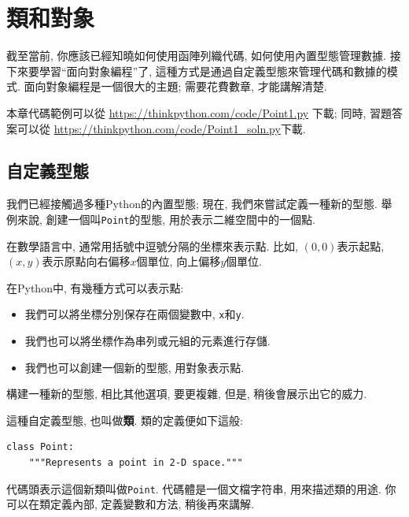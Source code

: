 \documentclass[10pt]{book}
\begin{document}
\chapter{類和對象}
\label{clobjects}

截至當前, 你應該已經知曉如何使用函陣列織代碼, 
如何使用內置型態管理數據. 
接下來要學習``面向對象編程''了, 
這種方式是通過自定義型態來管理代碼和數據的模式. 
面向對象編程是一個很大的主題; 需要花費數章, 才能講解清楚. 

本章代碼範例可以從
\url{https://thinkpython.com/code/Point1.py} 下載;
同時, 習題答案可以從
\url{https://thinkpython.com/code/Point1_soln.py}下載.


\section{自定義型態}
\label{point}

我們已經接觸過多種Python的內置型態;
現在, 我們來嘗試定義一種新的型態. 
舉例來說, 創建一個叫{\tt Point}的型態, 用於表示二維空間中的一個點. 

在數學語言中, 通常用括號中逗號分隔的坐標來表示點. 
比如, $(0,0)$表示起點, $(x,y)$表示原點向右偏移$x$個單位, 
向上偏移$y$個單位. 

在Python中, 有幾種方式可以表示點:

\begin{itemize}

\item 我們可以將坐標分別保存在兩個變數中, {\tt x}和{\tt y}. 

\item 我們也可以將坐標作為串列或元組的元素進行存儲. 

\item 我們也可以創建一個新的型態, 用對象表示點. 

\end{itemize}

構建一種新的型態, 相比其他選項, 要更複雜, 
但是, 稍後會展示出它的威力. 

這種自定義型態, 也叫做{\bf 類}. 
類的定義便如下這般:

\begin{verbatim}
class Point:
    """Represents a point in 2-D space."""
\end{verbatim}
%
代碼頭表示這個新類叫做{\tt Point}. 
代碼體是一個文檔字符串, 用來描述類的用途. 
你可以在類定義內部, 定義變數和方法, 
稍後再來講解. 
\end{document}
